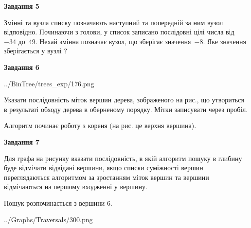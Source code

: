 \documentclass[12pt, ukrainian]{article}
\begin{document}
{\begin {large}
{\begin {center}\textbf{Завдання 5}\end {center}}\par
Змінні  та  вузла списку позначають наступний та попередній за ним вузол відповідно. Починаючи з голови, у список записано послідовні цілі числа від~$-34$ до~$49$. Нехай змінна  позначає вузол, що зберігає значення~$-8$.
Яке значення зберігається у вузлі  ?\par
\newpage

{\begin {center}\textbf{Завдання 6}\end {center}}\par

\begin{center}
	{../BinTree/trees_exp/176.png}
\end{center}
Указати послідовність міток вершин дерева, зображеного на рис., що утвориться в результаті обходу дерева в оберненому порядку. Мітки записувати через пробіл.\par Алгоритм починає роботу з кореня (на рис. це верхня вершина).\par
\newpage

{\begin {center}\textbf{Завдання 7}\end {center}}\par
Для графа на рисунку вказати послідовність, в якій алгоритм пошуку в глибину буде відмічати відвідані вершини, якщо списки суміжності вершин переглядаються алгоритмом за зростанням міток вершин та вершини відмічаються на першому вход\-женні у вершину.\par
Пошук розпочинається з вершини 6.\par

\begin{center}
	{../Graphs/Traversals/300.png}
\end{center}\par
\newpage


\end{large}}
\end{document}
